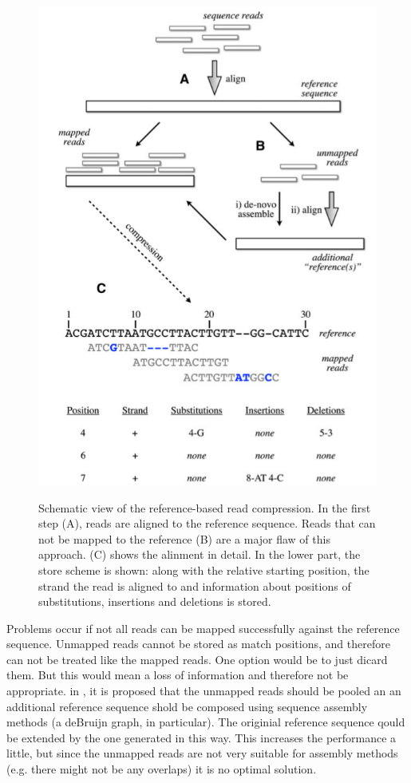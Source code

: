 \documentclass[acmtocl,acmnow]{article}
\begin{document}
  \begin{figure}
\begin{center}
    \includegraphics[height=\textwidth]{img/ReadCompressionSchematic.png}
    \label{readcomp}
    \caption{Schematic view of the reference-based read compression. In the first step (A), reads are aligned to the
    reference sequence. Reads that can not be mapped to the reference (B) are a major flaw of this approach. 
    (C) shows the alinment in detail. In the lower part, the store scheme is shown: along with the relative starting position,
    the strand the read is aligned to and information about positions of substitutions, insertions and deletions is stored.
    \cite{FriLeiCho}}
\end{center}
  \end{figure}

Problems occur if not all reads can be mapped successfully against the reference sequence. Unmapped reads cannot be stored
as match positions, and therefore can not be treated like the mapped reads. One option would be to just dicard them. But
this would mean a loss of information and therefore not be appropriate. in \cite{FriLeiCho}, it is proposed that the
unmapped reads should be pooled an an additional reference sequence shold be composed using sequence assembly methods 
(a deBruijn graph, in particular). The originial reference sequence qould be extended by the one generated in this way.
This increases the performance a little, but since the unmapped reads are not very suitable for assembly methods (e.g.
there might not be any overlaps) it is no optimal solution.
\end{document}
